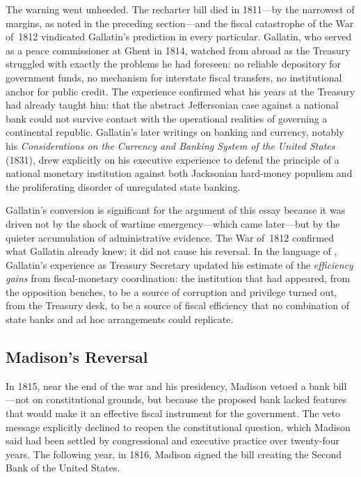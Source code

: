 \documentclass[12pt]{article}
\begin{document}
The warning went unheeded.  The recharter bill died in 1811---by the
narrowest of margins, as noted in the preceding section---and the fiscal
catastrophe of the War of~1812 vindicated Gallatin's prediction in every
particular.  Gallatin, who served as a peace commissioner at Ghent in
1814, watched from abroad as the Treasury struggled with exactly the
problems he had foreseen: no reliable depository for government funds,
no mechanism for interstate fiscal transfers, no institutional anchor
for public credit.  The experience confirmed what his years at the
Treasury had already taught him: that the abstract Jeffersonian case
against a national bank could not survive contact with the operational
realities of governing a continental republic.  Gallatin's later
writings on banking and currency, notably his \textit{Considerations on
the Currency and Banking System of the United States} (1831), drew
explicitly on his executive experience to defend the principle of a
national monetary institution against both Jacksonian hard-money
populism and the proliferating disorder of unregulated state banking.

Gallatin's conversion is significant for the argument of this essay
because it was driven not by the shock of wartime emergency---which came
later---but by the quieter accumulation of administrative evidence.
The War of~1812 confirmed what Gallatin already knew; it did not cause
his reversal.  In the language of \citet{Sargent2011}, Gallatin's
experience as Treasury Secretary updated his estimate of the
\emph{efficiency gains} from fiscal-monetary coordination: the
institution that had appeared, from the opposition benches, to be a
source of corruption and privilege turned out, from the Treasury desk,
to be a source of fiscal efficiency that no combination of state banks
and ad hoc arrangements could replicate.

\subsection{Madison's Reversal}

In 1815, near the end of the war and his presidency, Madison vetoed a
bank bill---not on constitutional grounds, but because the proposed
bank lacked features that would make it an effective fiscal instrument
for the government.  The veto message explicitly declined to reopen the
constitutional question, which Madison said had been settled by
congressional and executive practice over twenty-four years.  The
following year, in 1816, Madison signed the bill creating the Second
Bank of the United States.
\end{document}
